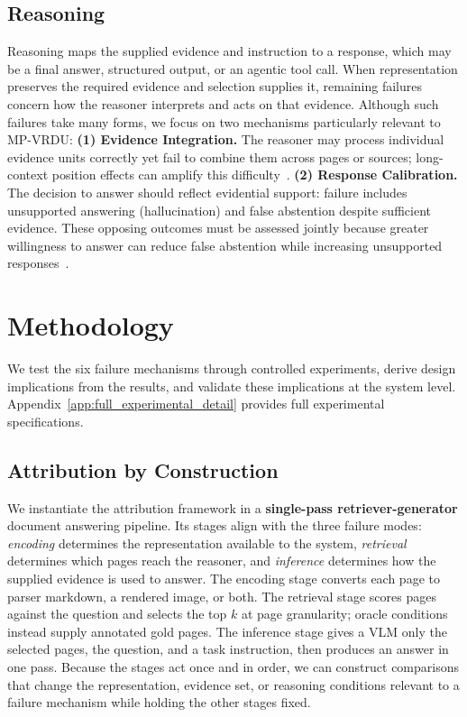 \documentclass[11pt]{article}
\begin{document}
\subsection{Reasoning}
\label{sec:fm_reasoning}

Reasoning maps the supplied evidence and instruction to a response, which may be a final answer, structured output, or an agentic tool call. When representation preserves the required evidence and selection supplies it, remaining failures concern how the reasoner interprets and acts on that evidence. Although such failures take many forms, we focus on two mechanisms particularly relevant to MP-VRDU:
\textbf{(1) Evidence Integration.} The reasoner may process individual evidence units correctly yet fail to combine them across pages or sources; long-context position effects can amplify this difficulty~\citep{liu2024lost}.
\textbf{(2) Response Calibration.} The decision to answer should reflect evidential support: failure includes unsupported answering (hallucination) and false abstention despite sufficient evidence. These opposing outcomes must be assessed jointly because greater willingness to answer can reduce false abstention while increasing unsupported responses~\citep{whitehead2022reliable}.

\section{Methodology}
\label{sec:methodology}

We test the six failure mechanisms through controlled experiments, derive design implications from the results, and validate these implications at the system level. Appendix~\ref{app:full_experimental_detail} provides full experimental specifications.

\subsection{Attribution by Construction}
\label{sec:attribution}

We instantiate the attribution framework in a \textbf{single-pass retriever-generator} document answering pipeline. Its stages align with the three failure modes: \textit{encoding} determines the representation available to the system, \textit{retrieval} determines which pages reach the reasoner, and \textit{inference} determines how the supplied evidence is used to answer. The encoding stage converts each page to parser markdown, a rendered image, or both. The retrieval stage scores pages against the question and selects the top $k$ at page granularity; oracle conditions instead supply annotated gold pages. The inference stage gives a VLM only the selected pages, the question, and a task instruction, then produces an answer in one pass. Because the stages act once and in order, we can construct comparisons that change the representation, evidence set, or reasoning conditions relevant to a failure mechanism while holding the other stages fixed.
\end{document}
